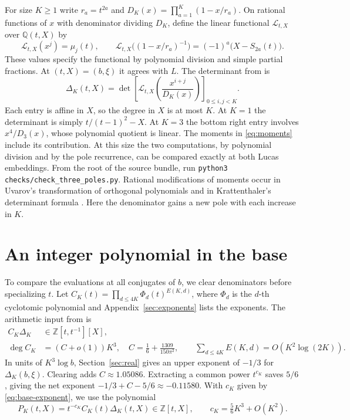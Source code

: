\documentclass[11pt,letterpaper]{article}
\newcommand{\Q}{\mathbb Q}
\newcommand{\Z}{\mathbb Z}
\newcommand{\LL}{\mathcal L}
\begin{document}
For size \(K\ge1\) write \(r_a=t^{2a}\) and
\(D_K(x)=\prod_{a=1}^K(1-x/r_a)\). On rational functions of \(x\) with
denominator dividing \(D_K\), define the linear functional \(\LL_{t,X}\)
over \(\Q(t,X)\) by
\[
 \LL_{t,X}(x^j)=\mu_j(t),\qquad
 \LL_{t,X}\big((1-x/r_a)^{-1}\big)=(-1)^a\big(X-S_{2a}(t)\big).
\]
These values specify the functional by polynomial division and simple
partial fractions. At \((t,X)=(b,\xi)\) it agrees with \(L\).
The determinant from \cite[\S2]{uplift} is
\begin{equation}\label{eq:delta}
 \Delta_K(t,X)=
 \det\!\left[\LL_{t,X}\!\left(\frac{x^{i+j}}{D_K(x)}\right)\right]_{0\le i,j<K}.
\end{equation}
Each entry is affine in \(X\), so the degree in \(X\) is at most \(K\).
At \(K=1\) the determinant is simply \(t/(t-1)^2-X\). At \(K=3\) the
bottom right entry involves \(x^4/D_3(x)\), whose polynomial quotient
is linear. The moments in \eqref{eq:moments} include its contribution.
At this size the two computations, by polynomial division and by the
pole recurrence, can be compared exactly at both Lucas embeddings. From the
root of the source bundle, run \texttt{python3}
\nolinkurl{checks/check_three_poles.py}.
Rational modifications of moments occur in Uvarov's transformation of
orthogonal polynomials \cite[\S1]{uvarov} and in Krattenthaler's
determinant formula \cite[Theorem~1]{kratt}.
Here the denominator gains a new pole with each increase in \(K\).

\section{An integer polynomial in the base}\label{sec:integer}
To compare the evaluations at all conjugates of \(b\), we clear
denominators before specializing \(t\). Let
\(C_K(t)=\prod_{d\le4K}\Phi_d(t)^{E(K,d)}\), where \(\Phi_d\) is the
\(d\)-th cyclotomic polynomial and Appendix~\ref{sec:exponents} lists the
exponents. The arithmetic input from \cite[(4.1), Proposition~4.1
and the proof of Proposition~5.1]{uplift} is
\begin{align}
 C_K\Delta_K&\in\Z[t,t^{-1}][X],\label{eq:laurent}\\
 \deg C_K&=(C+o(1))K^3,\quad
 C=\frac16+\frac{1309}{150\pi^2},\qquad
 \sum_{d\le4K}E(K,d)=O\!\left(K^2\log(2K)\right).             \label{eq:degree}
\end{align}
In units of \(K^3\log b\), Section~\ref{sec:real} gives an upper exponent
of \(-1/3\) for \(\Delta_K(b,\xi)\). Clearing adds \(C\approx1.05086\).
Extracting a common power \(t^{c_K}\) saves \(5/6\), giving the net exponent
\(-1/3+C-5/6\approx-0.11580\). With \(c_K\) given by \eqref{eq:base-exponent},
we use the polynomial
\begin{equation}\label{eq:normalized}
 P_K(t,X)=t^{-c_K}C_K(t)\Delta_K(t,X)\in\Z[t,X],
 \qquad c_K=\tfrac56K^3+O(K^2).
\end{equation}
\end{document}
